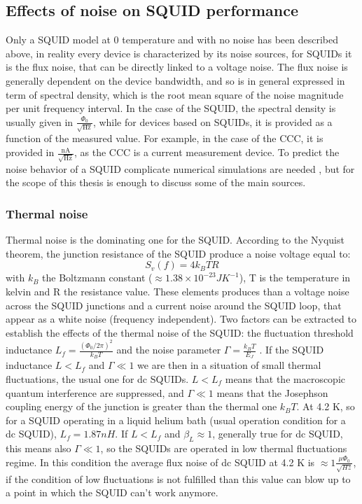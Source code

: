 \documentclass[12pt,a4paper]{report}
\begin{document}
    \subsection{Effects of noise on SQUID performance}
    Only a SQUID model at 0 temperature and with no noise has been described above, in reality every device is characterized by its noise sources, for SQUIDs it is the flux noise, that can be directly linked to a voltage noise. The flux noise is generally dependent on the device bandwidth, and so is in general expressed in term of spectral density, which is the root mean square of the noise magnitude per unit frequency interval. In the case of the SQUID, the spectral density is usually given in $\frac{\Phi_0}{\sqrt{\text{Hz}}}$, while for devices based on SQUIDs, it is provided as a function of the measured value. For example, in the case of the CCC, it is provided in $\frac{\text{nA}}{\sqrt{\text{Hz}}}$, as the CCC is a current measurement device.
    To predict the noise behavior of a SQUID complicate numerical simulations are needed \cite{Squid_handbook_1}, but for the scope of this thesis is enough to discuss some of the main sources.
    \subsubsection{Thermal noise}
    Thermal noise is the dominating one for the SQUID. According to the Nyquist theorem, the junction resistance of the SQUID produce a noise voltage equal to:
    \begin{equation}
    	S_v(f)=4k_BTR
    \end{equation}
    with $k_B$ the Boltzmann constant ($\approx 1.38\times10^{-23}JK^{-1}$), T is the temperature in kelvin and R the resistance value. These elements produces than a voltage noise across the SQUID junctions and a current noise around the SQUID loop, that appear as a white noise (frequency independent). Two factors can be extracted to establish the effects of the thermal noise of the SQUID: the fluctuation threshold inductance $L_f=\frac{(\Phi_0/2\pi)^2}{k_BT}$ and the noise parameter $\varGamma = \frac{k_BT}{E_J}$ \cite{Squid_handbook_1}. If the SQUID inductance $L<L_f$ and $\varGamma \ll 1$ we are then in a situation of small thermal fluctuations, the usual one for dc SQUIDs. $L<L_f$ means that the macroscopic quantum interference are suppressed, and $\varGamma \ll1$ means that the Josephson coupling energy of the junction is greater than the thermal one $k_BT$. At 4.2 K, so for a SQUID operating in a liquid helium bath (usual operation condition for a dc SQUID), $L_f = 1.87 nH$. If $L<L_f$ and $\beta_L\approx1$, generally true for dc SQUID, this means also $\varGamma \ll1$, so the SQUIDs are operated in low thermal fluctuations regime. In this condition the average flux noise of dc SQUID at 4.2 K is $\approx 1 \frac{\mu \Phi_0}{\sqrt{Hz}}$, if the condition of low fluctuations is not fulfilled than this value can blow up to a point in which the SQUID can't work anymore.
\end{document}
